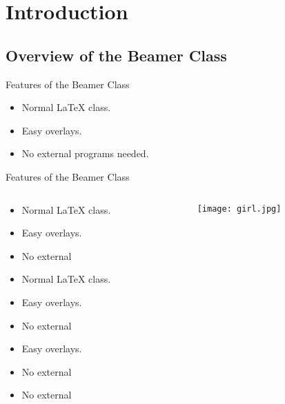 \section{Introduction}
\subsection{Overview of the Beamer Class}
\begin{frame}{Features of the Beamer Class}
  \begin{itemize}
  \item Normal LaTeX class.
  \item Easy overlays.
  \item No external programs needed.
  \end{itemize}
\end{frame}


\begin{frame}{Features of the Beamer Class}
\begin{columns}
\begin{column}[c]{0.5\textwidth}
  \begin{itemize}
  \item Normal LaTeX class.
  \item Easy overlays.
  \item No external 
  \item Normal LaTeX class.
  \item Easy overlays.
  \item No external 
  \item Easy overlays.
  \item No external 
  \item No external 
  \end{itemize}
\end{column}
\begin{column}[c]{0.5\textwidth}
\texttt{[image: girl.jpg]}
\end{column}
\end{columns}
\end{frame}

